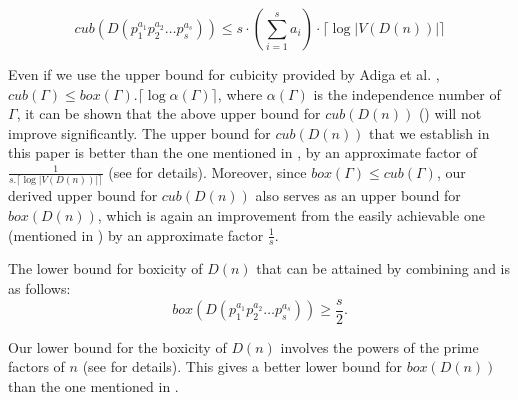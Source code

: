\documentclass[twoside, 11pt]{article}
\newcommand{\G}{\Gamma}
\newcommand{\ceil}[1]{\lceil #1 \rceil}
\begin{document}
\begin{equation} \label{eq : upper bound for cubicity from well-known}
     cub(D(p_1^{a_1}p_2^{a_2}\dots p_s^{a_s})) \leq s \cdot (\sum_{i=1}^s a_i) \cdot \ceil{\log |V(D(n))|} %
 \end{equation}

 Even if we use the upper bound for cubicity provided by Adiga et al. \cite{adiga2010cubicity}, $cub(\G) \leq box(\G).\ceil{\log \alpha(\G)}$, where $\alpha(\G)$ is the independence number of $\G$, it can be shown that the above upper bound for $cub(D(n))$ () will not improve significantly. %
 The upper bound for $cub(D(n))$ that we establish in this paper is better than the one mentioned in , by an approximate factor of 
 $\frac{1}{s. \ceil{\log |V(D(n))|}}$ (see  for details). Moreover, since $box(\G) \leq cub(\G)$, our derived upper bound for $cub(D(n))$ also serves as an upper bound for $box(D(n))$, which is again an improvement from the easily achievable one (mentioned in ) by an approximate factor $\frac{1}{s}$.


The lower bound for boxicity of $D(n)$ that can be attained by combining  and   is as follows:
 \begin{equation}\label{eq: low bound from well-known}
   box(D(p_1^{a_1}p_2^{a_2}\dots p_s^{a_s})) \geq \frac{s}{2}.  
 \end{equation}


 Our lower bound for the boxicity of $D(n)$ involves the powers of the prime factors of $n$ (see  for details). This gives a better lower bound for $box(D(n))$ than the one mentioned in .
\end{document}
